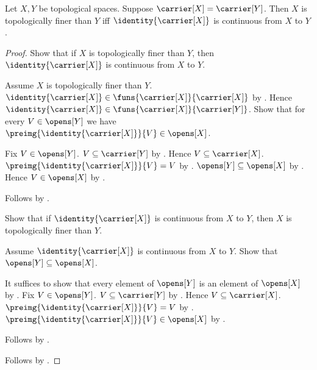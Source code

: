 \begin{theorem}\label{topologically_finer_iff_identity_continuous}
    Let $X,Y$ be topological spaces.
    Suppose $\carrier[X]=\carrier[Y]$.
    Then $X$ is topologically finer than $Y$ iff
        $\identity{\carrier[X]}$ is continuous from $X$ to $Y$.
\end{theorem}
\begin{proof}
    Show that if $X$ is topologically finer than $Y$, then
        $\identity{\carrier[X]}$ is continuous from $X$ to $Y$.
    \begin{subproof}
        Assume $X$ is topologically finer than $Y$.
        $\identity{\carrier[X]}\in
            \funs{\carrier[X]}{\carrier[X]}$ by
            .
        Hence $\identity{\carrier[X]}\in
            \funs{\carrier[X]}{\carrier[Y]}$.
        Show that for every $V\in\opens[Y]$ we have
            $\preimg{\identity{\carrier[X]}}{V}\in\opens[X]$.
        \begin{subproof}
            Fix $V\in\opens[Y]$.
            $V\subseteq\carrier[Y]$ by .
            Hence $V\subseteq\carrier[X]$.
            $\preimg{\identity{\carrier[X]}}{V}=V$ by
                .
            $\opens[Y]\subseteq\opens[X]$ by
                .
            Hence $V\in\opens[X]$ by .
        \end{subproof}
        Follows by .
    \end{subproof}

    Show that if $\identity{\carrier[X]}$ is continuous from $X$ to $Y$,
        then $X$ is topologically finer than $Y$.
    \begin{subproof}
        Assume $\identity{\carrier[X]}$ is continuous from $X$ to $Y$.
        Show that $\opens[Y]\subseteq\opens[X]$.
        \begin{subproof}
            It suffices to show that every element of $\opens[Y]$ is an
                element of $\opens[X]$ by .
            Fix $V\in\opens[Y]$.
            $V\subseteq\carrier[Y]$ by .
            Hence $V\subseteq\carrier[X]$.
            $\preimg{\identity{\carrier[X]}}{V}=V$ by
                .
            $\preimg{\identity{\carrier[X]}}{V}\in\opens[X]$ by
                .
        \end{subproof}
        Follows by .
    \end{subproof}
    Follows by \auto.
\end{proof}
